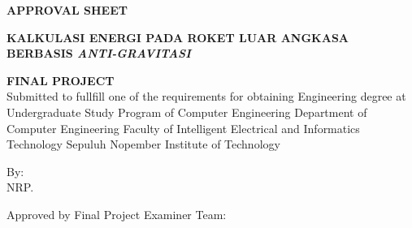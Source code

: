 \begin{center}
  \large
  \textbf{APPROVAL SHEET}
\end{center}

\thispagestyle{empty}

\begin{center}
  \textbf{KALKULASI ENERGI PADA ROKET LUAR ANGKASA BERBASIS \emph{ANTI-GRAVITASI}}
\end{center}

\begingroup
\small


\begin{center}
  \textbf{FINAL PROJECT}
  \\Submitted to fullfill one of the requirements for obtaining Engineering degree at Undergraduate Study Program of Computer Engineering Department of Computer Engineering Faculty of Intelligent Electrical and Informatics Technology Sepuluh Nopember Institute of Technology
\end{center}


\begin{center}
  By: \name{}
  \\NRP. \nrp{}
\end{center}



\begin{center}
  Approved by Final Project Examiner Team:
\end{center}


\begingroup
\setlength{\tabcolsep}{0pt}

